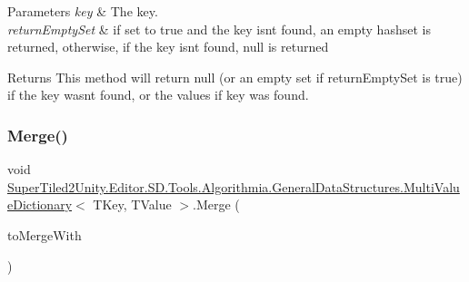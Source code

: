 \begin{DoxyParams}{Parameters}
{\em key} & The key.\\
\hline
{\em return\+Empty\+Set} & if set to true and the key isn\textquotesingle{}t found, an empty hashset is returned, otherwise, if the key isn\textquotesingle{}t found, null is returned\\
\hline
\end{DoxyParams}
\begin{DoxyReturn}{Returns}
This method will return null (or an empty set if return\+Empty\+Set is true) if the key wasn\textquotesingle{}t found, or the values if key was found. 
\end{DoxyReturn}
\mbox{\label{class_super_tiled2_unity_1_1_editor_1_1_s_d_1_1_tools_1_1_algorithmia_1_1_general_data_structures_1_1_multi_value_dictionary_af9d3e836e512ec78970c0c037a8f9000}} 
\subsubsection{\texorpdfstring{Merge()}{Merge()}}
{\footnotesize\ttfamily void \mbox{\hyperlink{class_super_tiled2_unity_1_1_editor_1_1_s_d_1_1_tools_1_1_algorithmia_1_1_general_data_structures_1_1_multi_value_dictionary}{Super\+Tiled2\+Unity.\+Editor.\+S\+D.\+Tools.\+Algorithmia.\+General\+Data\+Structures.\+Multi\+Value\+Dictionary}}$<$ T\+Key, T\+Value $>$.Merge (\begin{DoxyParamCaption}\item[{\mbox{\hyperlink{class_super_tiled2_unity_1_1_editor_1_1_s_d_1_1_tools_1_1_algorithmia_1_1_general_data_structures_1_1_multi_value_dictionary}{Multi\+Value\+Dictionary}}$<$ T\+Key, T\+Value $>$}]{to\+Merge\+With }\end{DoxyParamCaption})}



